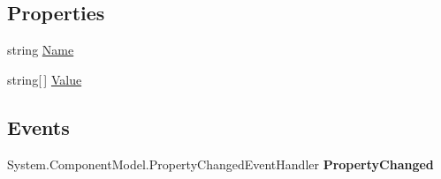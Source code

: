 \subsection*{Properties}
\begin{DoxyCompactItemize}
\item 
\hypertarget{class_price___comparison_1_1amazon_1_1ecs_1_1_variation_attribute_aa45cf5b01bc12b1930c3e1608a10f439}{string \hyperlink{class_price___comparison_1_1amazon_1_1ecs_1_1_variation_attribute_aa45cf5b01bc12b1930c3e1608a10f439}{Name}}\label{class_price___comparison_1_1amazon_1_1ecs_1_1_variation_attribute_aa45cf5b01bc12b1930c3e1608a10f439}

\begin{DoxyCompactList}\small\item\em \end{DoxyCompactList}\item 
\hypertarget{class_price___comparison_1_1amazon_1_1ecs_1_1_variation_attribute_a3c44b990d352f2fa0c73725ab188b63d}{string\mbox{[}$\,$\mbox{]} \hyperlink{class_price___comparison_1_1amazon_1_1ecs_1_1_variation_attribute_a3c44b990d352f2fa0c73725ab188b63d}{Value}}\label{class_price___comparison_1_1amazon_1_1ecs_1_1_variation_attribute_a3c44b990d352f2fa0c73725ab188b63d}

\begin{DoxyCompactList}\small\item\em \end{DoxyCompactList}\end{DoxyCompactItemize}
\subsection*{Events}
\begin{DoxyCompactItemize}
\item 
\hypertarget{class_price___comparison_1_1amazon_1_1ecs_1_1_variation_attribute_ae4127ec5ffc63649567104c14fa5bb3f}{System.\-Component\-Model.\-Property\-Changed\-Event\-Handler {\bfseries Property\-Changed}}\label{class_price___comparison_1_1amazon_1_1ecs_1_1_variation_attribute_ae4127ec5ffc63649567104c14fa5bb3f}

\end{DoxyCompactItemize}
